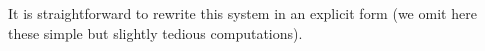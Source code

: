 It is straightforward to rewrite this system in an explicit form (we omit here these simple but slightly tedious computations).
%
%
%
